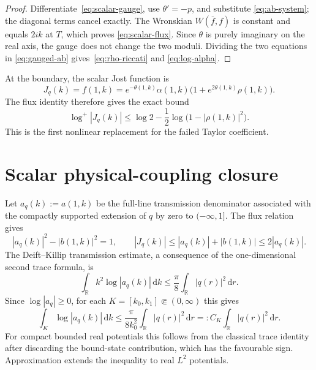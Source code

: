 \documentclass[11pt]{article}
\newcommand{\R}{\mathbb R}
\newcommand{\dd}{\,\mathrm d}
\theoremstyle{definition}
\begin{document}
\begin{proof}
Differentiate~\eqref{eq:scalar-gauge}, use $\theta'=-p$, and substitute
\eqref{eq:ab-system}; the diagonal terms cancel exactly.  The Wronskian
$W(\overline f,f)$ is constant and equals $2ik$ at $T$, which proves
\eqref{eq:scalar-flux}.  Since $\theta$ is purely imaginary on the real axis,
the gauge does not change the two moduli.  Dividing the two equations in
\eqref{eq:gauged-ab} gives~\eqref{eq:rho-riccati} and
\eqref{eq:log-alpha}.
\end{proof}

At the boundary, the scalar Jost function is
\begin{equation}
 J_q(k)=f(1,k)
 =e^{-\theta(1,k)}\alpha(1,k)
  \bigl(1+e^{2\theta(1,k)}\rho(1,k)\bigr).
 \label{eq:J-rho}
\end{equation}
The flux identity therefore gives the exact bound
\begin{equation}
 \log^+|J_q(k)|
 \leq \log2-\frac12\log\bigl(1-|\rho(1,k)|^2\bigr).
 \label{eq:J-hyperbolic-bound}
\end{equation}
This is the first nonlinear replacement for the failed Taylor coefficient.

\section{Scalar physical-coupling closure}

Let $a_q(k):=a(1,k)$ be the full-line transmission denominator associated
with the compactly supported extension of $q$ by zero to $(-\infty,1]$.
The flux relation gives
\begin{equation}
 |a_q(k)|^2-|b(1,k)|^2=1,
 \qquad
 |J_q(k)|\leq |a_q(k)|+|b(1,k)|\leq2|a_q(k)|.
 \label{eq:J-versus-a}
\end{equation}
The Deift--Killip transmission estimate, a consequence of the
one-dimensional second trace formula, is
\begin{equation}
 \int_\R k^2\log|a_q(k)|\dd k
 \leq\frac{\pi}{8}\int_\R|q(r)|^2\dd r.
 \label{eq:deift-killip}
\end{equation}
Since $\log|a_q|\geq0$, for each
$K=[k_0,k_1]\Subset(0,\infty)$ this gives
\begin{equation}
 \int_K\log|a_q(k)|\dd k
 \leq \frac{\pi}{8k_0^2}\int_\R |q(r)|^2\dd r
 =:C_K\int_\R |q(r)|^2\dd r.
 \label{eq:second-trace-local}
\end{equation}
For compact bounded real potentials this follows from the classical trace
identity after discarding the bound-state contribution, which has the
favourable sign.  Approximation extends the inequality to real $L^2$
potentials.
\end{document}
